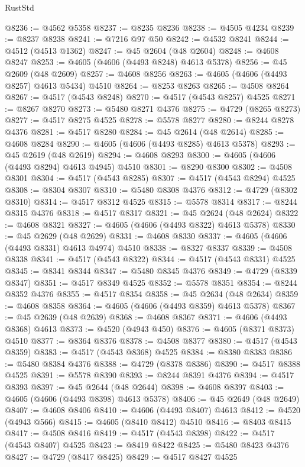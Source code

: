 \begin{lexlean}{RustStd}
\begin{coremodule}
@8236 := @4562 @5358
@8237 := @8235 @8236
@8238 := @4505 @4234
@8239 := @8237 @8238
@8241 := @7216 @97 @50
@8242 := @4532 @8241
@8244 := @4512 (@4513 @1362)
@8247 := @45 @2604 (@48 @2604)
@8248 := @4608 @8247
@8253 := @4605 (@4606 (@4493 @8248) @4613 @5378)
@8256 := @45 @2609 (@48 @2609)
@8257 := @4608 @8256
@8263 := @4605 (@4606 (@4493 @8257) @4613 @5434) @4510
@8264 := @8253 @8263
@8265 := @4508 @8264
@8267 := @4517 (@4543 @8248)
@8270 := @4517 (@4543 @8257) @4525
@8271 := @8267 @8270
@8273 := @5480 @8271 @4376
@8275 := @4729 (@8265 @8273)
@8277 := @4517 @8275 @4525
@8278 := @5578 @8277
@8280 := @8244 @8278 @4376
@8281 := @4517 @8280
@8284 := @45 @2614 (@48 @2614)
@8285 := @4608 @8284
@8290 := @4605 (@4606 (@4493 @8285) @4613 @5378)
@8293 := @45 @2619 (@48 @2619)
@8294 := @4608 @8293
@8300 := @4605 (@4606 (@4493 @8294) @4613 @4945) @4510
@8301 := @8290 @8300
@8302 := @4508 @8301
@8304 := @4517 (@4543 @8285)
@8307 := @4517 (@4543 @8294) @4525
@8308 := @8304 @8307
@8310 := @5480 @8308 @4376
@8312 := @4729 (@8302 @8310)
@8314 := @4517 @8312 @4525
@8315 := @5578 @8314
@8317 := @8244 @8315 @4376
@8318 := @4517 @8317
@8321 := @45 @2624 (@48 @2624)
@8322 := @4608 @8321
@8327 := @4605 (@4606 (@4493 @8322) @4613 @5378)
@8330 := @45 @2629 (@48 @2629)
@8331 := @4608 @8330
@8337 := @4605 (@4606 (@4493 @8331) @4613 @4974) @4510
@8338 := @8327 @8337
@8339 := @4508 @8338
@8341 := @4517 (@4543 @8322)
@8344 := @4517 (@4543 @8331) @4525
@8345 := @8341 @8344
@8347 := @5480 @8345 @4376
@8349 := @4729 (@8339 @8347)
@8351 := @4517 @8349 @4525
@8352 := @5578 @8351
@8354 := @8244 @8352 @4376
@8355 := @4517 @8354
@8358 := @45 @2634 (@48 @2634)
@8359 := @4608 @8358
@8364 := @4605 (@4606 (@4493 @8359) @4613 @5378)
@8367 := @45 @2639 (@48 @2639)
@8368 := @4608 @8367
@8371 := @4606 (@4493 @8368) @4613
@8373 := @4520 (@4943 @450)
@8376 := @4605 (@8371 @8373) @4510
@8377 := @8364 @8376
@8378 := @4508 @8377
@8380 := @4517 (@4543 @8359)
@8383 := @4517 (@4543 @8368) @4525
@8384 := @8380 @8383
@8386 := @5480 @8384 @4376
@8388 := @4729 (@8378 @8386)
@8390 := @4517 @8388 @4525
@8391 := @5578 @8390
@8393 := @8244 @8391 @4376
@8394 := @4517 @8393
@8397 := @45 @2644 (@48 @2644)
@8398 := @4608 @8397
@8403 := @4605 (@4606 (@4493 @8398) @4613 @5378)
@8406 := @45 @2649 (@48 @2649)
@8407 := @4608 @8406
@8410 := @4606 (@4493 @8407) @4613
@8412 := @4520 (@4943 @566)
@8415 := @4605 (@8410 @8412) @4510
@8416 := @8403 @8415
@8417 := @4508 @8416
@8419 := @4517 (@4543 @8398)
@8422 := @4517 (@4543 @8407) @4525
@8423 := @8419 @8422
@8425 := @5480 @8423 @4376
@8427 := @4729 (@8417 @8425)
@8429 := @4517 @8427 @4525

\end{coremodule}
\end{lexlean}
